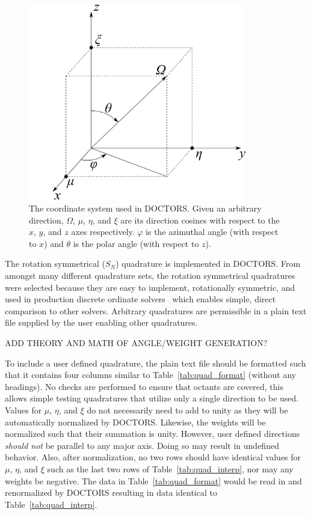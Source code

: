 \begin{figure}[tb]
  \begin{center}
   \includegraphics[width=3.75in]{figs/coord_sys}
  \end{center}
  \caption{The coordinate system used in DOCTORS. Given an arbitrary direction, $\Omega$, $\mu$, $\eta$, and $\xi$ are its direction cosines with respect to the $x$, $y$, and $z$ axes respectively. $\varphi$ is the azimuthal angle (with respect to $x$) and $\theta$ is the polar angle (with respect to $z$).}
\label{fig:coord_sys}
\end{figure}

The rotation symmetrical ($S_N$) quadrature is implemented in DOCTORS. From amongst many different quadrature sets, the rotation symmetrical quadratures were selected because they are easy to implement, rotationally symmetric, and used in production discrete ordinate solvers~\citep{ref:evanst} which enables simple, direct comparison to other solvers. Arbitrary quadratures are permissible in a plain text file supplied by the user enabling other quadratures.

ADD THEORY AND MATH OF ANGLE/WEIGHT GENERATION?

To include a user defined quadrature, the plain text file should be formatted such that it contains four columns similar to Table~\ref{tab:quad_format} (without any headings). No checks are performed to ensure that octants are covered, this allows simple testing quadratures that utilize only a single direction to be used. Values for $\mu$, $\eta$, and $\xi$ do not necessarily need to add to unity as they will be automatically normalized by DOCTORS. Likewise, the weights will be normalized such that their summation is unity. However, user defined directions \textit{should not} be parallel to any major axis. Doing so may result in undefined behavior. Also, after normalization, no two rows should have identical values for $\mu$, $\eta$, and $\xi$ such as the last two rows of Table~\ref{tab:quad_interp}, nor may any weights be negative. The data in Table~\ref{tab:quad_format} would be read in and renormalized by DOCTORS resulting in data identical to  Table~\ref{tab:quad_interp}.

